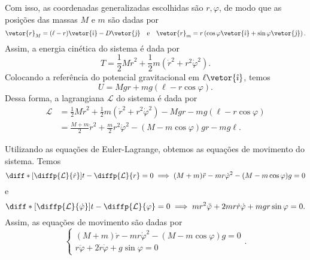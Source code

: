 Com isso, as coordenadas generalizadas escolhidas são \(r, \varphi\), de modo que as posições das massas \(M\) e \(m\) são dadas por
\begin{equation*}
    \vetor{r}_M = (\ell - r)\vetor{\hat\imath}-D \vetor{\hat\jmath}\quad\text{e}\quad\vetor{r}_m = r\left(\cos\varphi \vetor{\hat\imath} + \sin\varphi \vetor{\hat\jmath}\right).
\end{equation*}
Assim, a energia cinética do sistema é dada por
\begin{equation*}
    T = \frac12 M\dot{r}^2 + \frac12m \left(\dot{r}^2 + r^2\dot\varphi^2\right).
\end{equation*}
Colocando a referência do potencial gravitacional em \(\ell \vetor{\hat\imath}\), temos
\begin{equation*}
    U = Mgr + mg\left(\ell - r\cos\varphi\right).
\end{equation*}
Dessa forma, a lagrangiana \(\mathcal{L}\) do sistema é dada por
\begin{align*}
    \mathcal{L} &= \frac12 M\dot{r}^2 + \frac12m \left(\dot{r}^2 + r^2\dot\varphi^2\right) - Mgr - mg\left(\ell - r\cos\varphi\right)\\
                &= \frac{M+m}{2}\dot{r}^2 + \frac{m}{2}r^2\dot\varphi^2 - (M - m\cos\varphi)gr - mg\ell.
\end{align*}

Utilizando as equações de Euler-Lagrange, obtemos as equações de movimento do sistema. Temos
\begin{equation*}
    \diff*{{\left[\diffp{\mathcal{L}}{\dot{r}}\right]}}{t} - \diffp{\mathcal{L}}{r} = 0 \implies (M+m)\ddot{r} - mr\dot\varphi^2 - (M - m\cos\varphi)g = 0
\end{equation*}
e
\begin{equation*}
    \diff*{{\left[\diffp{\mathcal{L}}{\dot{\varphi}}\right]}}{t} - \diffp{\mathcal{L}}{\varphi} = 0 \implies mr^2\ddot\varphi + 2mr\dot{r}\dot\varphi + mgr\sin\varphi = 0.
\end{equation*}
Assim, as equações de movimento são dadas por
\begin{equation*}
    \begin{cases}
            (M+m)\ddot{r} - mr\dot\varphi^2 - (M - m\cos\varphi)g = 0\\
            r\ddot\varphi + 2\dot{r}\dot\varphi + g\sin\varphi = 0
    \end{cases}.
\end{equation*}
